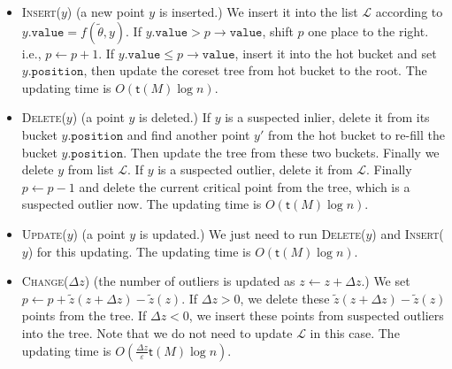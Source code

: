 
\begin{itemize}
	\item \textsc{Insert($ y $)} (a new point $ y $ is inserted.) We insert it into the list $ \mathscr{L} $ according to $y.\mathtt{value}=f(\tilde{\theta},y) $. If $ y.\mathtt{value}>p\rightarrow \mathtt{value} $, shift $ p $ one place to the right. i.e., $ p\gets p+1 $. If $ y.\mathtt{value} \leq p\rightarrow \mathtt{value} $, insert it into the hot bucket and set $ y.\mathtt{position} $, then update the coreset tree from hot bucket to the root. The updating time is $ O(\mathsf{t}(M) \log n) $.
	\item \textsc{Delete($ y $)} (a point $ y $ is deleted.) If $ y $ is a suspected inlier, delete it from its bucket $ y.\mathtt{position} $ and find another point $ y' $ from the hot bucket to re-fill the bucket $ y.\mathtt{position} $. Then update the tree from these two buckets. Finally we delete $ y $ from list $ \mathscr{L} $. If $ y $ is a suspected outlier, delete it from $ \mathscr{L} $. Finally $  p\gets p-1 $ and delete the current critical point from the tree, which is a suspected outlier now. The updating time is $ O(\mathsf{t}(M)\log n) $.
	\item \textsc{Update($ y $)} (a point $ y$ is updated.) 
	We just need to run \textsc{Delete($ y $)} and \textsc{Insert($ y $)} for this updating. The updating time is $ O(\mathsf{t}(M)\log n) $.
	\item \textsc{Change($ \Delta z $)} (the number of outliers is updated as $ z\gets z+\Delta z $.) 
	We set $ p\gets p+\tilde{z}(z+\Delta z)-\tilde{z}(z) $. If $ \Delta z>0 $, we delete these $ \tilde{z}(z+\Delta z)-\tilde{z}(z) $ points from the tree. If $ \Delta z<0 $, we insert these points from suspected outliers into the tree. Note that we do not need to update $ \mathscr{L} $ in this case. The updating time is $ O(\frac{\Delta z}{\varepsilon}\mathsf{t}(M)\log n) $.
\end{itemize}










